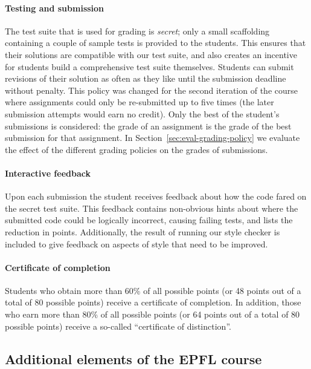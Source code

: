 \documentclass{sig-alternate}
\begin{document}
\paragraph{Testing and submission}

The test suite that is used for grading is {\em secret}; only a small
scaffolding containing a couple of sample tests is provided to the students.
This ensures that their solutions are compatible with our test suite, and
also creates an incentive for students build a comprehensive test
suite themselves. Students can submit revisions of their solution as often
as they like until the submission deadline without penalty. This policy was
changed for the second iteration of the course where assignments could only be
re-submitted up to five times (the later submission attempts would
earn no credit). Only the best of the student's submissions is considered:
the grade of an assignment is the grade of the best submission for that
assignment. In Section~\ref{sec:eval-grading-policy} we evaluate the effect
of the different grading policies on the grades of submissions.

\paragraph{Interactive feedback}

Upon each submission the student receives feedback about how the code fared on
the secret test suite. This feedback contains non-obvious hints about where the submitted code could be logically incorrect, causing failing tests, and
lists the reduction in points. Additionally, the result of
running our style checker is included to give feedback on aspects of style
that need to be improved.


\paragraph{Certificate of completion} Students who obtain more than 60\% of
all possible points (or 48 points out of a total of 80 possible points) receive a certificate of completion. In addition, those
who earn more than 80\% of all possible points (or 64 points out of a total of 80 possible points) receive a so-called
``certificate of distinction''.

\subsection{Additional elements of the EPFL course}
\end{document}
